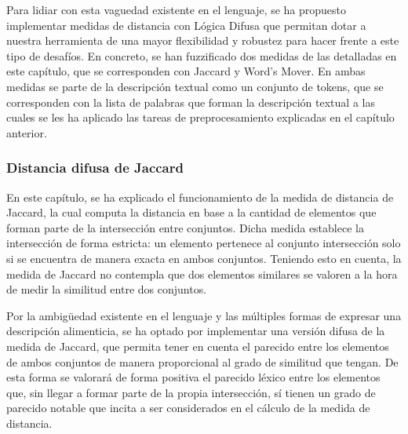 Para lidiar con esta vaguedad existente en el lenguaje, se ha propuesto implementar medidas de distancia con Lógica Difusa que permitan dotar a nuestra herramienta de una mayor flexibilidad y robustez para hacer frente a este tipo de desafíos. En concreto, se han fuzzificado dos medidas de las detalladas en este capítulo, que se corresponden con Jaccard y Word's Mover. En ambas medidas se parte de la descripción textual como un conjunto de tokens, que se corresponden con la lista de palabras que forman la descripción textual a las cuales se les ha aplicado las tareas de preprocesamiento explicadas en el capítulo anterior. 




\subsubsection{Distancia difusa de Jaccard}
En este capítulo, se ha explicado el funcionamiento de la medida de distancia de Jaccard, la cual computa la distancia en base a la cantidad de elementos que forman parte de la intersección entre conjuntos. Dicha medida establece la intersección de forma estricta: un elemento pertenece al conjunto intersección solo si se encuentra de manera exacta en ambos conjuntos. Teniendo esto en cuenta, la medida de Jaccard no contempla que dos elementos similares se valoren a la hora de medir la similitud entre dos conjuntos.

Por la ambigüedad existente en el lenguaje y las múltiples formas de expresar una descripción alimenticia, se ha optado por implementar una versión difusa de la medida de Jaccard, que permita tener en cuenta el parecido entre los elementos de ambos conjuntos de manera proporcional al grado de similitud que tengan. De esta forma se valorará de forma positiva el parecido léxico entre los elementos que, sin llegar a formar parte de la propia intersección, sí tienen un grado de parecido notable que incita a ser considerados en el cálculo de la medida de distancia.

